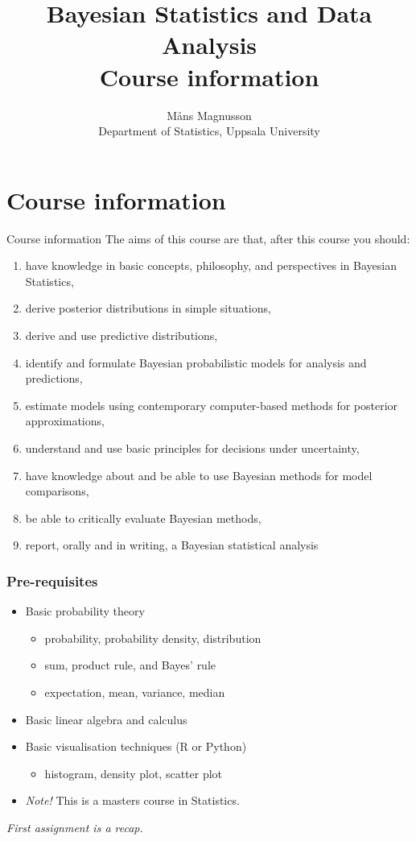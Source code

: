 \documentclass[10pt]{beamer}
\title[]{{\color{black}Bayesian Statistics and Data Analysis \\ Course information}}
\author[]{M{\aa}ns Magnusson \\ Department of Statistics, Uppsala University}
\date{}
\begin{document}
\frame{\titlepage
}



\section{Course information}
\frame{\sectionpage}

\begin{frame}{Course information}
The aims of this course are that, after this course you should:\\[3mm]\pause
\begin{enumerate}
\item have knowledge in basic concepts, philosophy, and perspectives in Bayesian Statistics,
\item derive posterior distributions in simple situations,
\item derive and use predictive distributions,
\item identify and formulate Bayesian probabilistic models for analysis and predictions,
\item estimate models using contemporary computer-based methods for posterior approximations,
\item understand and use basic principles for decisions under uncertainty,
\item have knowledge about and be able to use Bayesian methods for model comparisons,
\item be able to critically evaluate Bayesian methods,
\item report, orally and in writing, a Bayesian statistical analysis
\end{enumerate}

\end{frame}


\begin{frame}
  \frametitle{Pre-requisites}
  \begin{itemize}
  \item Basic probability theory
    \begin{itemize}
    \item probability, probability density, distribution
    \item sum, product rule, and Bayes' rule
    \item expectation, mean, variance, median
  \end{itemize}
  \pause
  \item Basic linear algebra and calculus
  \pause
  \item Basic visualisation techniques (R or Python)
  \begin{itemize}
    \item histogram, density plot, scatter plot
  \end{itemize}
  \item \emph{Note!} This is a masters course in Statistics.
  \end{itemize}
  \pause
  \emph{First assignment is a recap.}
\end{frame}
\end{document}
